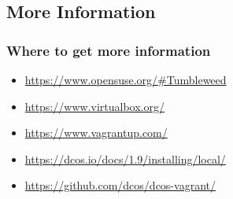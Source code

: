 \documentclass[aspectratio=169,11pt,hyperref={colorlinks=true}]{beamer}
\begin{document}
\subsection{More Information}
\begin{frame}
\frametitle{Where to get more information}
  \begin{itemize}
    \item \url{https://www.opensuse.org/\#Tumbleweed}
    \item \url{https://www.virtualbox.org/}
    \item \url{https://www.vagrantup.com/}
    \item \url{https://dcos.io/docs/1.9/installing/local/}
    \item \url{https://github.com/dcos/dcos-vagrant/}
  \end{itemize}
\end{frame}
\end{document}
